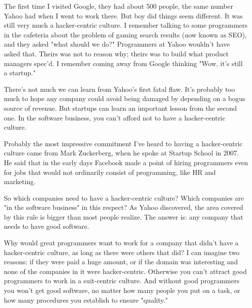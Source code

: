 The first time I visited Google, they had
                    about 500 people, the same number Yahoo had when I went to
                    work there. But boy did things seem different. It was still
                    very much a hacker-centric culture. I remember talking to
                    some programmers in the cafeteria about the problem of
                    gaming search results (now known as SEO), and they asked
                    "what should we do?" Programmers at Yahoo wouldn't have
                    asked that. Theirs was not to reason why; theirs was to
                    build what product managers spec'd. I remember coming away
                    from Google thinking "Wow, it's still a startup."

There's
                    not much we can learn from Yahoo's first fatal flaw. It's
                    probably too much to hope any company could avoid being
                    damaged by depending on a bogus source of revenue. But
                    startups can learn an important lesson from the second one.
                    In the software business, you can't afford not to have a
                    hacker-centric culture.

Probably the most
                    impressive commitment I've heard to having a hacker-centric
                    culture came from Mark Zuckerberg, when he spoke at Startup
                    School in 2007. He said that in the early days Facebook made
                    a point of hiring programmers even for jobs that would not
                    ordinarily consist of programming, like HR and marketing.

So
                    which companies need to have a hacker-centric culture? Which
                    companies are "in the software business" in this respect? As
                    Yahoo discovered, the area covered by this rule is bigger
                    than most people realize. The answer is: any company that
                    needs to have good software.

Why would great
                    programmers want to work for a company that didn't have a
                    hacker-centric culture, as long as there were others that
                    did? I can imagine two reasons: if they were paid a huge
                    amount, or if the domain was interesting and none of the
                    companies in it were hacker-centric. Otherwise you can't
                    attract good programmers to work in a suit-centric culture.
                    And without good programmers you won't get good software, no
                    matter how many people you put on a task, or how many
                    procedures you establish to ensure "quality."

